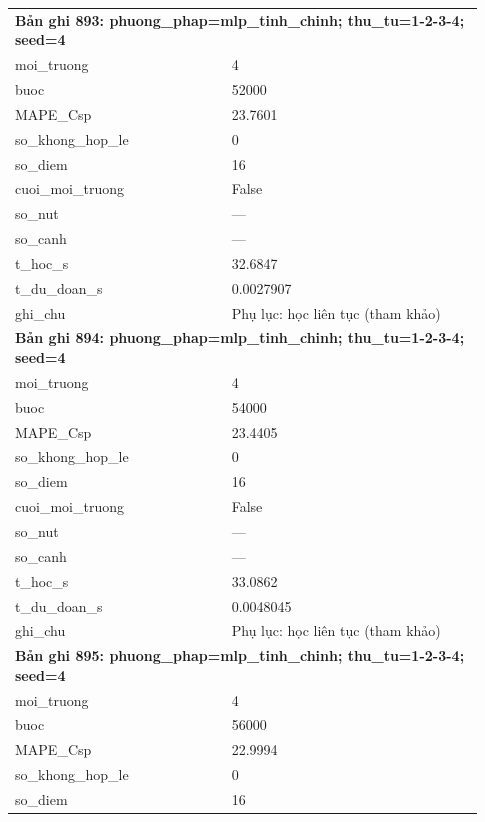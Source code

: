 \begin{longtable}{p{0.43\linewidth}p{0.50\linewidth}}
\midrule
\multicolumn{2}{p{0.95\linewidth}}{\textbf{Bản ghi 893: phuong\_phap=mlp\_tinh\_chinh; thu\_tu=1-2-3-4; seed=4}} \\
moi\_\allowbreak truong & 4 \\
buoc & 52000 \\
MAPE\_\allowbreak Csp & 23.7601 \\
so\_\allowbreak khong\_\allowbreak hop\_\allowbreak le & 0 \\
so\_\allowbreak diem & 16 \\
cuoi\_\allowbreak moi\_\allowbreak truong & False \\
so\_\allowbreak nut & — \\
so\_\allowbreak canh & — \\
t\_\allowbreak hoc\_\allowbreak s & 32.6847 \\
t\_\allowbreak du\_\allowbreak doan\_\allowbreak s & 0.0027907 \\
ghi\_\allowbreak chu & Phụ lục: học liên tục (tham khảo) \\
\midrule
\multicolumn{2}{p{0.95\linewidth}}{\textbf{Bản ghi 894: phuong\_phap=mlp\_tinh\_chinh; thu\_tu=1-2-3-4; seed=4}} \\
moi\_\allowbreak truong & 4 \\
buoc & 54000 \\
MAPE\_\allowbreak Csp & 23.4405 \\
so\_\allowbreak khong\_\allowbreak hop\_\allowbreak le & 0 \\
so\_\allowbreak diem & 16 \\
cuoi\_\allowbreak moi\_\allowbreak truong & False \\
so\_\allowbreak nut & — \\
so\_\allowbreak canh & — \\
t\_\allowbreak hoc\_\allowbreak s & 33.0862 \\
t\_\allowbreak du\_\allowbreak doan\_\allowbreak s & 0.0048045 \\
ghi\_\allowbreak chu & Phụ lục: học liên tục (tham khảo) \\
\midrule
\multicolumn{2}{p{0.95\linewidth}}{\textbf{Bản ghi 895: phuong\_phap=mlp\_tinh\_chinh; thu\_tu=1-2-3-4; seed=4}} \\
moi\_\allowbreak truong & 4 \\
buoc & 56000 \\
MAPE\_\allowbreak Csp & 22.9994 \\
so\_\allowbreak khong\_\allowbreak hop\_\allowbreak le & 0 \\
so\_\allowbreak diem & 16 \\

\end{longtable}
